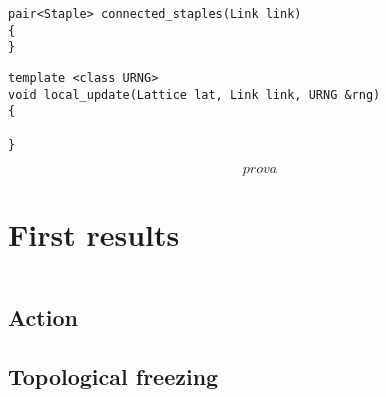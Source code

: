 \begin{lstlisting}[caption={Connected staples function}]
pair<Staple> connected_staples(Link link)
{
}
\end{lstlisting}

\begin{lstlisting}[caption={Local update function}]
template <class URNG>
void local_update(Lattice lat, Link link, URNG &rng)
{

}
\end{lstlisting}


\begin{equation}
    prova
\end{equation}

\section{First results}

\[
    
\]
\the\textwidth

\subsection{Action}

\subsection{Topological freezing}

